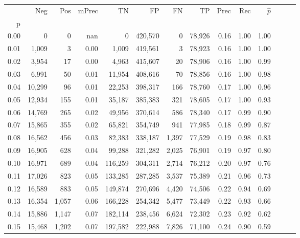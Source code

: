 \begin{tabular}{rrrrrrrrrrrrrr}
\toprule
{} &     Neg &    Pos & mPrec &       TN &       FP &      FN &      TP &  Prec &   Rec & $\hat{p}$ \\
p    &         &        &       &          &          &         &         &       &       &           \\
\midrule
0.00 &       0 &      0 &   nan &        0 &  420,570 &       0 &  78,926 &  0.16 &  1.00 &      1.00 \\
0.01 &   1,009 &      3 &  0.00 &    1,009 &  419,561 &       3 &  78,923 &  0.16 &  1.00 &      1.00 \\
0.02 &   3,954 &     17 &  0.00 &    4,963 &  415,607 &      20 &  78,906 &  0.16 &  1.00 &      0.99 \\
0.03 &   6,991 &     50 &  0.01 &   11,954 &  408,616 &      70 &  78,856 &  0.16 &  1.00 &      0.98 \\
0.04 &  10,299 &     96 &  0.01 &   22,253 &  398,317 &     166 &  78,760 &  0.17 &  1.00 &      0.96 \\
0.05 &  12,934 &    155 &  0.01 &   35,187 &  385,383 &     321 &  78,605 &  0.17 &  1.00 &      0.93 \\
0.06 &  14,769 &    265 &  0.02 &   49,956 &  370,614 &     586 &  78,340 &  0.17 &  0.99 &      0.90 \\
0.07 &  15,865 &    355 &  0.02 &   65,821 &  354,749 &     941 &  77,985 &  0.18 &  0.99 &      0.87 \\
0.08 &  16,562 &    456 &  0.03 &   82,383 &  338,187 &   1,397 &  77,529 &  0.19 &  0.98 &      0.83 \\
0.09 &  16,905 &    628 &  0.04 &   99,288 &  321,282 &   2,025 &  76,901 &  0.19 &  0.97 &      0.80 \\
0.10 &  16,971 &    689 &  0.04 &  116,259 &  304,311 &   2,714 &  76,212 &  0.20 &  0.97 &      0.76 \\
0.11 &  17,026 &    823 &  0.05 &  133,285 &  287,285 &   3,537 &  75,389 &  0.21 &  0.96 &      0.73 \\
0.12 &  16,589 &    883 &  0.05 &  149,874 &  270,696 &   4,420 &  74,506 &  0.22 &  0.94 &      0.69 \\
0.13 &  16,354 &  1,057 &  0.06 &  166,228 &  254,342 &   5,477 &  73,449 &  0.22 &  0.93 &      0.66 \\
0.14 &  15,886 &  1,147 &  0.07 &  182,114 &  238,456 &   6,624 &  72,302 &  0.23 &  0.92 &      0.62 \\
0.15 &  15,468 &  1,202 &  0.07 &  197,582 &  222,988 &   7,826 &  71,100 &  0.24 &  0.90 &      0.59 \\

\end{tabular}
